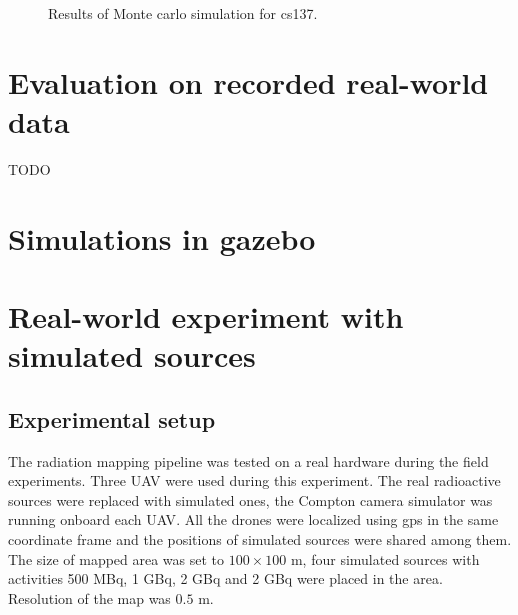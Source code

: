 \begin{figure}[!htb]
  \centering
  \caption{Results of Monte carlo simulation for cs137.}
  \label{fig:monte_clar}
\end{figure}

\section{Evaluation on recorded real-world data}
TODO
\section{Simulations in gazebo}

\section{Real-world experiment with simulated sources}

\subsection{Experimental setup}
The radiation mapping pipeline was tested on a real hardware during the field experiments.
Three \ac{UAV} were used during this experiment.
The real radioactive sources were replaced with simulated ones, the Compton camera simulator \cite{TODO} was running onboard each \ac{UAV}.
All the drones were localized using \ac{gps} in the same coordinate frame and the positions of simulated sources were shared among them.
The size of mapped area was set to $100 \times 100$ m, four simulated sources with activities 500 MBq, 1 GBq, 2 GBq and 2 GBq were placed in the area.
Resolution of the map was $0.5$ m.

